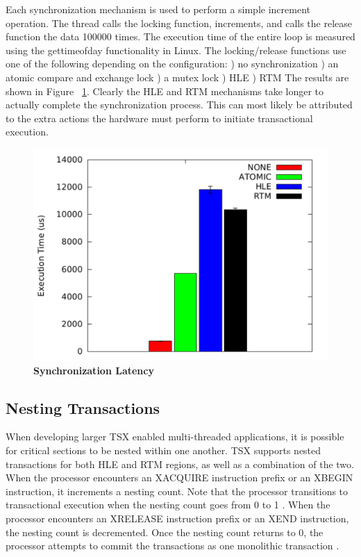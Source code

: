 \documentclass[a4paper]{article}
\begin{document}
\indent
Each synchronization mechanism is used to perform a simple increment operation.
The thread calls the locking function, increments, and calls the release
function the data 100000 times.  The execution time of the entire loop is
measured using the gettimeofday functionality in Linux.  The locking/release
functions use one of the following depending on the configuration: 
) no synchronization 
) an atomic compare and exchange lock
) a mutex lock
) HLE
) RTM
The results are shown in Figure ~\ref{fig:tsx_latency}.  Clearly the HLE and RTM
mechanisms take longer to actually complete the synchronization process.  This
can most likely be attributed to the extra actions the hardware must perform to
initiate transactional execution.

\begin{figure}[H]
    \centering
    \graphicspath{ {./figures/} }
    \includegraphics[width=\textwidth,height=\textheight,keepaspectratio]{SyncBM}
    \caption{\textbf{Synchronization Latency}}
    \label{fig:tsx_latency}
\end{figure}


\subsection{\textbf{Nesting Transactions}}

\indent
When developing larger TSX enabled multi-threaded applications, it is
possible for critical sections to be nested within one another.  TSX supports
nested transactions for both HLE and RTM regions, as well as a combination of
the two.  When the processor encounters an XACQUIRE instruction prefix or an 
XBEGIN instruction, it increments a nesting count.  Note that the processor
transitions to transactional execution when the nesting count goes from 0 to 1
\cite{intel_prog_ref}.  When the processor encounters an XRELEASE instruction
prefix or an XEND instruction, the nesting count is decremented.  Once the
nesting count returns to 0, the processor attempts to commit the transactions as
one monolithic transaction \cite{intel_prog_ref}.
\par
\end{document}
